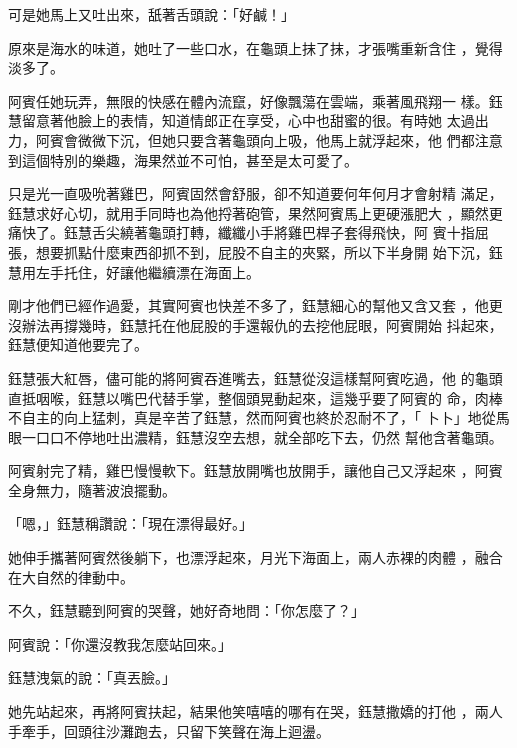 可是她馬上又吐出來，舐著舌頭說：「好鹹！」

原來是海水的味道，她吐了一些口水，在龜頭上抹了抹，才張嘴重新含住
，覺得淡多了。

阿賓任她玩弄，無限的快感在體內流竄，好像飄蕩在雲端，乘著風飛翔一
樣。鈺慧留意著他臉上的表情，知道情郎正在享受，心中也甜蜜的很。有時她
太過出力，阿賓會微微下沉，但她只要含著龜頭向上吸，他馬上就浮起來，他
們都注意到這個特別的樂趣，海果然並不可怕，甚至是太可愛了。

只是光一直吸吮著雞巴，阿賓固然會舒服，卻不知道要何年何月才會射精
滿足，鈺慧求好心切，就用手同時也為他捋著砲管，果然阿賓馬上更硬漲肥大
，顯然更痛快了。鈺慧舌尖繞著龜頭打轉，纖纖小手將雞巴桿子套得飛快，阿
賓十指屈張，想要抓點什麼東西卻抓不到，屁股不自主的夾緊，所以下半身開
始下沉，鈺慧用左手托住，好讓他繼續漂在海面上。

剛才他們已經作過愛，其實阿賓也快差不多了，鈺慧細心的幫他又含又套
，他更沒辦法再撐幾時，鈺慧托在他屁股的手還報仇的去挖他屁眼，阿賓開始
抖起來，鈺慧便知道他要完了。

鈺慧張大紅唇，儘可能的將阿賓吞進嘴去，鈺慧從沒這樣幫阿賓吃過，他
的龜頭直抵咽喉，鈺慧以嘴巴代替手掌，整個頭晃動起來，這幾乎要了阿賓的
命，肉棒不自主的向上猛刺，真是辛苦了鈺慧，然而阿賓也終於忍耐不了，「
卜卜」地從馬眼一口口不停地吐出濃精，鈺慧沒空去想，就全部吃下去，仍然
幫他含著龜頭。

阿賓射完了精，雞巴慢慢軟下。鈺慧放開嘴也放開手，讓他自己又浮起來
，阿賓全身無力，隨著波浪擺動。

「嗯，」鈺慧稱讚說：「現在漂得最好。」

她伸手攜著阿賓然後躺下，也漂浮起來，月光下海面上，兩人赤裸的肉體
，融合在大自然的律動中。

不久，鈺慧聽到阿賓的哭聲，她好奇地問：「你怎麼了？」

阿賓說：「你還沒教我怎麼站回來。」

鈺慧洩氣的說：「真丟臉。」

她先站起來，再將阿賓扶起，結果他笑嘻嘻的哪有在哭，鈺慧撒嬌的打他
，兩人手牽手，回頭往沙灘跑去，只留下笑聲在海上迴盪。










